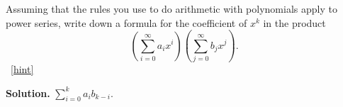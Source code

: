 \documentclass{book}
\begin{document}
\setcounter{project}{248}
\addtocounter{project}{-1}
\begin{activity}[]\label{coeffinpowerseries}
\hypertarget{p-1345}{}%
Assuming that the rules you use to do arithmetic with polynomials apply to power series, write down a formula for the coefficient of \(x^k\) in the product%
\begin{equation*}
\left(\sum_{i=0}^\infty a_ix^i\right)\left(\sum_{j=0}^\infty
b_jx^j\right)\text{.}
\end{equation*}
%
~\hfill{\tiny\hyperlink{a-248}{[hint]}\hypertarget{q-248}{}}\par\smallskip%
\noindent\textbf{Solution.}\hypertarget{solution-174}{}\quad%
\hypertarget{p-1347}{}%
\(\sum_{i=0}^k a_ib_{k-i}\).%
\end{activity}
\end{document}
